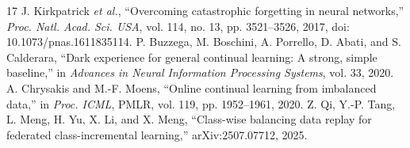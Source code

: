 \documentclass[journal,10pt]{IEEEtran}
\begin{document}
\begin{thebibliography}{17}
 J. Kirkpatrick \emph{et al.}, ``Overcoming catastrophic forgetting in neural networks,'' \emph{Proc. Natl. Acad. Sci. USA}, vol. 114, no. 13, pp. 3521--3526, 2017, doi: 10.1073/pnas.1611835114.
 P. Buzzega, M. Boschini, A. Porrello, D. Abati, and S. Calderara, ``Dark experience for general continual learning: A strong, simple baseline,'' in \emph{Advances in Neural Information Processing Systems}, vol. 33, 2020.
 A. Chrysakis and M.-F. Moens, ``Online continual learning from imbalanced data,'' in \emph{Proc. ICML}, PMLR, vol. 119, pp. 1952--1961, 2020.
 Z. Qi, Y.-P. Tang, L. Meng, H. Yu, X. Li, and X. Meng, ``Class-wise balancing data replay for federated class-incremental learning,'' arXiv:2507.07712, 2025.
\end{thebibliography}
\end{document}
